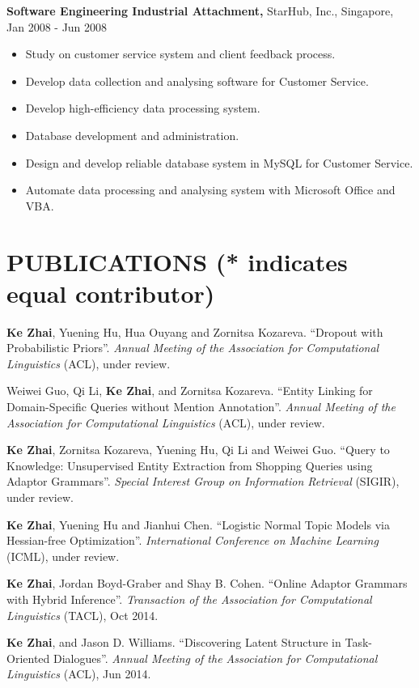 \documentclass{style/resume}
\begin{document}
\begin{resume}
  {\bf Software Engineering Industrial Attachment,} StarHub, Inc., Singapore, Jan 2008 - Jun 2008
  \begin{itemize}
  \item Study on customer service system and client feedback process.
  \item Develop data collection and analysing software for Customer Service.
  \item Develop high-efficiency data processing system.
  \item Database development and administration.
  \item Design and develop reliable database system in MySQL for Customer Service.
  \item Automate data processing and analysing system with Microsoft Office and VBA.
  \end{itemize}
  
  \section{PUBLICATIONS (* indicates equal contributor)} 
  \vspace{0.1in}

  {\bf Ke Zhai}, Yuening Hu, Hua Ouyang and Zornitsa
  Kozareva. ``Dropout with Probabilistic Priors''. {\it Annual Meeting
    of the Association for Computational Linguistics} (ACL), under
  review.

  Weiwei Guo, Qi Li, {\bf Ke Zhai}, and Zornitsa Kozareva. ``Entity
  Linking for Domain-Specific Queries without Mention
  Annotation''. {\it Annual Meeting of the Association for
    Computational Linguistics} (ACL), under review.

  {\bf Ke Zhai}, Zornitsa Kozareva, Yuening Hu, Qi Li and Weiwei
  Guo. ``Query to Knowledge: Unsupervised Entity Extraction from
  Shopping Queries using Adaptor Grammars''. {\it Special Interest
    Group on Information Retrieval} (SIGIR), under review.

  {\bf Ke Zhai}, Yuening Hu and Jianhui Chen. ``Logistic Normal Topic
  Models via Hessian-free Optimization''. {\it International
    Conference on Machine Learning} (ICML), under review.

  {\bf Ke Zhai}, Jordan Boyd-Graber and Shay B. Cohen. ``Online
  Adaptor Grammars with Hybrid Inference''. {\it Transaction of the Association
    for Computational Linguistics} (TACL), Oct 2014.

  {\bf Ke Zhai}, and Jason D. Williams. ``Discovering Latent Structure
  in Task-Oriented Dialogues''. {\it Annual Meeting of the Association
    for Computational Linguistics} (ACL), Jun 2014.


\end{resume}
\end{document}
